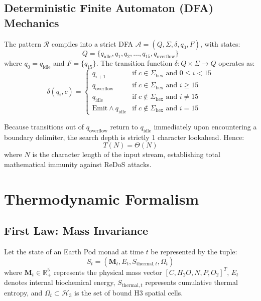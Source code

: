 \documentclass[10pt,journal,compsoc]{IEEEtran}
\begin{document}
\subsection{Deterministic Finite Automaton (DFA) Mechanics}
The pattern $\mathcal{R}$ compiles into a strict DFA $\mathcal{A} = (Q, \Sigma, \delta, q_0, F)$, with states:
\begin{equation}
Q = \{q_{\text{idle}}, q_1, q_2, \dots, q_{15}, q_{\text{overflow}}\}
\end{equation}
where $q_0 = q_{\text{idle}}$ and $F = \{q_{15}\}$. The transition function $\delta: Q \times \Sigma \to Q$ operates as:
\begin{equation}
\delta(q_i, c) = \begin{cases}
q_{i+1} & \text{if } c \in \Sigma_{\text{hex}} \text{ and } 0 \le i < 15 \\
q_{\text{overflow}} & \text{if } c \in \Sigma_{\text{hex}} \text{ and } i \ge 15 \\
q_{\text{idle}} & \text{if } c \notin \Sigma_{\text{hex}} \text{ and } i \ne 15 \\
\text{Emit} \land q_{\text{idle}} & \text{if } c \notin \Sigma_{\text{hex}} \text{ and } i = 15
\end{cases}
\end{equation}

Because transitions out of $q_{\text{overflow}}$ return to $q_{\text{idle}}$ immediately upon encountering a boundary delimiter, the search depth is strictly 1 character lookahead. Hence:
\begin{equation}
T(N) = \Theta(N)
\end{equation}
where $N$ is the character length of the input stream, establishing total mathematical immunity against ReDoS attacks.

\section{Thermodynamic Formalism}

\subsection{First Law: Mass Invariance}
Let the state of an Earth Pod monad at time $t$ be represented by the tuple:
\begin{equation}
S_t = (\mathbf{M}_t, E_t, S_{\text{thermal}, t}, \Omega_t)
\end{equation}
where $\mathbf{M}_t \in \mathbb{R}^5_+$ represents the physical mass vector $[C, H_2O, N, P, O_2]^T$, $E_t$ denotes internal biochemical energy, $S_{\text{thermal}, t}$ represents cumulative thermal entropy, and $\Omega_t \subset \mathcal{H}_3$ is the set of bound H3 spatial cells.
\end{document}
